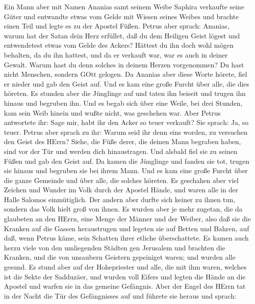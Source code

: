  Ein Mann aber mit Namen Ananias samt seinem Weibe Saphira
verkaufte seine Güter  und entwandte etwas vom Gelde mit
Wissen seines Weibes und brachte einen Teil und legte es zu der Apostel
Füßen.  Petrus aber sprach: Ananias, warum hat der Satan
dein Herz erfüllet, daß du dem Heiligen Geist lögest und entwendetest
etwas vom Gelde des Ackers?  Hättest du ihn doch wohl mögen
behalten, da du ihn hattest, und da er verkauft war, war es auch in
deiner Gewalt. Warum hast du denn solches in deinem Herzen vorgenommen?
Du hast nicht Menschen, sondern GOtt gelogen.  Da Ananias
aber diese Worte hörete, fiel er nieder und gab den Geist auf. Und es
kam eine große Furcht über alle, die dies höreten.  Es
stunden aber die Jünglinge auf und taten ihn beiseit und trugen ihn
hinaus und begruben ihn.  Und es begab sich über eine Weile,
bei drei Stunden, kam sein Weib hinein und wußte nicht, was geschehen
war.  Aber Petrus antwortete ihr: Sage mir, habt ihr den
Acker so teuer verkauft? Sie sprach: Ja, so teuer.  Petrus
aber sprach zu ihr: Warum seid ihr denn eins worden, zu versuchen den
Geist des HErrn? Siehe, die Füße derer, die deinen Mann begraben haben,
sind vor der Tür und werden dich hinaustragen.  Und alsbald
fiel sie zu seinen Füßen und gab den Geist auf. Da kamen die Jünglinge
und fanden sie tot, trugen sie hinaus und begruben sie bei ihrem Mann.
 Und es kam eine große Furcht über die ganze Gemeinde und
über alle, die solches höreten.  Es geschahen aber viel
Zeichen und Wunder im Volk durch der Apostel Hände, und waren alle in
der Halle Salomos einmütiglich.  Der andern aber durfte
sich keiner zu ihnen tun, sondern das Volk hielt groß von ihnen.
 Es wurden aber je mehr zugetan, die da glaubeten an den
HErrn, eine Menge der Männer und der Weiber,  also daß sie
die Kranken auf die Gassen heraustrugen und legeten sie auf Betten und
Bahren, auf daß, wenn Petrus käme, sein Schatten ihrer etliche
überschattete.  Es kamen auch herzu viele von den
umliegenden Städten gen Jerusalem und brachten die Kranken, und die von
unsaubern Geistern gepeiniget waren; und wurden alle gesund.
 Es stund aber auf der Hohepriester und alle, die mit ihm
waren, welches ist die Sekte der Sadduzäer, und wurden voll Eifers
 und legten die Hände an die Apostel und warfen sie in das
gemeine Gefängnis.  Aber der Engel des HErrn tat in der
Nacht die Tür des Gefängnisses auf und führete sie heraus und sprach:
